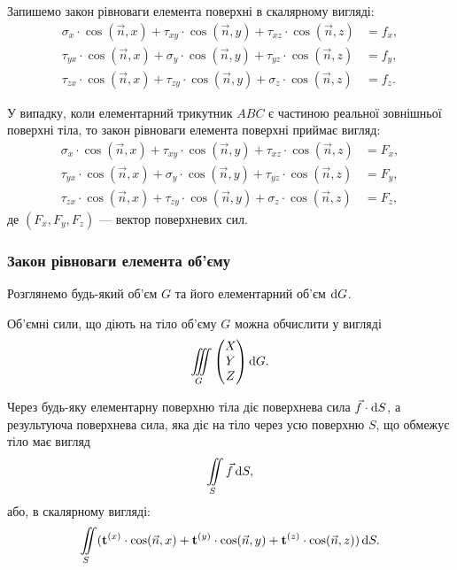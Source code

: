 Запишемо закон рівноваги елемента поверхні в скалярному вигляді:
\begin{align}
	\sigma_x \cdot \cos ( \vec n, x ) + \tau_{xy} \cdot \cos ( \vec n, y ) + \tau_{xz} \cdot \cos ( \vec n, z ) &= f_x, \\
	\tau_{yx} \cdot \cos ( \vec n, x ) + \sigma_y \cdot \cos ( \vec n, y ) + \tau_{yz} \cdot \cos ( \vec n, z ) &= f_y, \\
	\tau_{zx} \cdot \cos ( \vec n, x ) + \tau_{zy} \cdot \cos ( \vec n, y ) + \sigma_z \cdot \cos ( \vec n, z ) &= f_z.
\end{align}

У випадку, коли елементарний трикутник $ABC$ є частиною реальної зовнішньої поверхні тіла, то закон рівноваги елемента поверхні приймає вигляд:
\begin{align}
	\sigma_x \cdot \cos ( \vec n, x ) + \tau_{xy} \cdot \cos ( \vec n, y ) + \tau_{xz} \cdot \cos ( \vec n, z ) &= F_x, \\
	\tau_{yx} \cdot \cos ( \vec n, x ) + \sigma_y \cdot \cos ( \vec n, y ) + \tau_{yz} \cdot \cos ( \vec n, z ) &= F_y, \\
	\tau_{zx} \cdot \cos ( \vec n, x ) + \tau_{zy} \cdot \cos ( \vec n, y ) + \sigma_z \cdot \cos ( \vec n, z ) &= F_z,
\end{align}
де $(F_x, F_y, F_z)$ --- вектор поверхневих сил. \medskip

\subsubsection{Закон рівноваги елемента об'єму}

Розглянемо будь-який об'єм $G$ та його елементарний об'єм $\mathop{}\!\mathrm{d} G$. \medskip

Об'ємні сили, що діють на тіло об'єму $G$ можна обчислити у вигляді
\begin{equation}
	\displaystyle\iiint\limits_G \begin{pmatrix} X \\ Y \\ Z \end{pmatrix} \mathop{}\!\mathrm{d} G.
\end{equation}

Через будь-яку елементарну поверхню тіла діє поверхнева сила $\vec f \cdot \mathop{}\!\mathrm{d} S$, а результуюча поверхнева сила, яка діє на тіло через усю поверхню $S$, що обмежує тіло має вигляд 
\begin{equation}
	\displaystyle\iint\limits_S \vec f \mathop{}\!\mathrm{d} S,
\end{equation}
або, в скалярному вигляді:
\begin{equation}
	\displaystyle\iint\limits_S ( \textbf{t}^{(x)} \cdot \cos ( \vec n, x ) + \textbf{t}^{(y)} \cdot \cos(\vec n, y) + \textbf{t}^{(z)} \cdot \cos (\vec n, z) ) \mathop{}\!\mathrm{d} S.
\end{equation}

